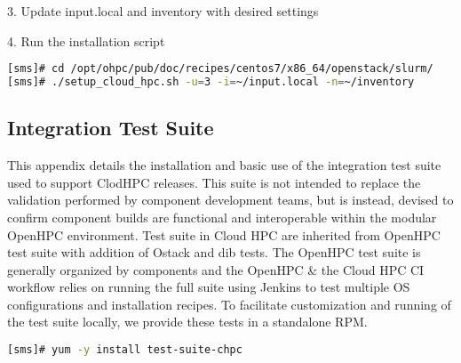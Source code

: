 3. Update input.local and inventory with desired settings

4. Run the installation script

\begin{lstlisting}[language=bash,keywords={},upquote=true]
[sms]# cd /opt/ohpc/pub/doc/recipes/centos7/x86_64/openstack/slurm/
[sms]# ./setup_cloud_hpc.sh -u=3 -i=~/input.local -n=~/inventory
\end{lstlisting}


\newpage
\subsection{Integration Test Suite}
	

This appendix details the installation and basic use of the integration test suite used to support ClodHPC releases. This suite is not intended to replace the validation performed by component development teams, but is instead, devised to confirm component builds are functional and interoperable within the modular OpenHPC environment. Test suite in Cloud HPC are inherited from OpenHPC test suite with addition of Ostack and dib tests. The OpenHPC test suite is generally organized by components and the OpenHPC & the Cloud HPC CI workflow relies on running the full suite using Jenkins to test multiple OS configurations and installation recipes. To facilitate customization and running of the test suite locally, we provide these tests in a standalone RPM.
\begin{lstlisting}[language=bash,keywords={},upquote=true]
[sms]# yum -y install test-suite-chpc
\end{lstlisting}

